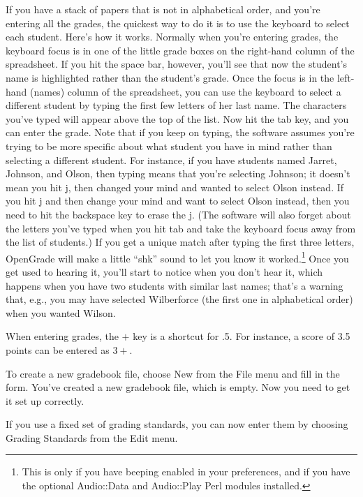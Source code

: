\documentclass{opengrade_doc}
\begin{document}
If you have a stack of papers that is not in alphabetical order, and
you're entering all the grades, the quickest way to do it is to
use the keyboard to select each student. 
Here's how it works. Normally when you're
entering grades, the keyboard focus is in one of the little grade
boxes on the right-hand column of the spreadsheet. If you hit the
space bar, however, you'll see that now the student's name is highlighted
rather than the student's grade. Once the focus is in the left-hand
(names) column of the spreadsheet, you can use the keyboard to select
a different student by typing the first few letters
of her last name. 
The characters you've typed
will appear above the top of the list. Now hit the tab key, and
you can enter the grade. 
Note that if you keep on typing, the software assumes you're trying
to be more specific about what student you have in mind rather than
selecting a different student. For instance, if you have students
named Jarret, Johnson, and Olson, then typing \verb@jo@ means
that you're selecting Johnson; it doesn't mean you hit j, then
changed your mind and wanted to select Olson instead. If you hit
j and then change your mind and want to select Olson instead,
then you need to hit the backspace key to erase the j.
(The software will also forget about the letters you've typed
when you hit tab and take the keyboard focus away from the list
of students.)
If you get a unique match after typing the first three
letters, OpenGrade will make a little ``shk'' sound to let you know it worked.\footnote{This
is only if you have beeping enabled in your preferences, and
if you have the optional Audio::Data and Audio::Play Perl modules
installed.}
Once you get used to hearing it, you'll start to notice when you
don't hear it, which happens when you have two students with similar
last names; that's a warning that, e.g., you may have selected
Wilberforce (the first one in alphabetical order) when you wanted
Wilson.

When entering grades, the $+$ key is a shortcut for .5. 
For instance, a score of 3.5 points can be entered as $3+$.

To create a new gradebook file, choose New from the File menu
and fill in the form. You've created a new gradebook file, which
is empty. Now you need to get it set up correctly.

If you use a fixed set of grading standards, you can now enter
them by choosing Grading Standards from the Edit menu.
\end{document}
